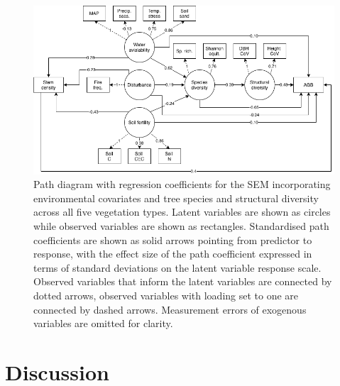 \documentclass[11pt,a4paper]{article}
\begin{document}
\begin{figure}[H]
\centering
	\includegraphics[width=\textwidth]{full}
	\caption{Path diagram with regression coefficients for the SEM incorporating environmental covariates and tree species and structural diversity across all five vegetation types. Latent variables are shown as circles while observed variables are shown as rectangles. Standardised path coefficients are shown as solid arrows pointing from predictor to response, with the effect size of the path coefficient expressed in terms of standard deviations on the latent variable response scale. Observed variables that inform the latent variables are connected by dotted arrows, observed variables with loading set to one are connected by dashed arrows. Measurement errors of exogenous variables are omitted for clarity.}
	\label{full_mod}
\end{figure}

\section{Discussion}
\end{document}

